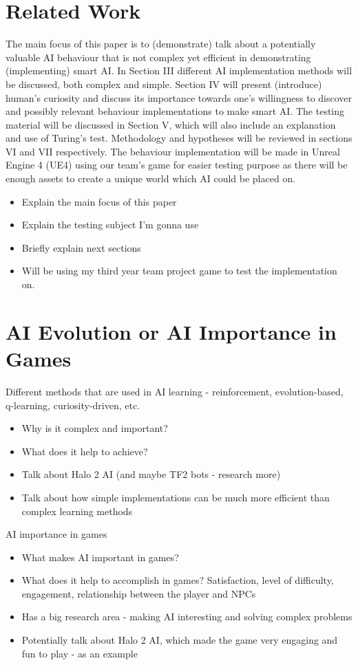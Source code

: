 \documentclass[journal]{IEEEtran}
\begin{document}
\section{Related Work} %
The main focus of this paper is to (demonstrate) talk about a potentially valuable AI behaviour that is not complex yet efficient in demonstrating (implementing) smart AI. In Section III different AI implementation methods will be discussed, both complex and simple. Section IV will present (introduce) human's curiosity and discuss its importance towards one's willingness to discover and possibly relevant behaviour implementations to make smart AI. The testing material will be discussed in Section V, which will also include an explanation and use of Turing's test. Methodology and hypotheses will be reviewed in sections VI and VII respectively. The behaviour implementation will be made in Unreal Engine 4 (UE4) using our team's game for easier testing purpose as there will be enough assets to create a unique world which AI could be placed on.
\begin{itemize}
	\item Explain the main focus of this paper
	\item Explain the testing subject I'm gonna use
	\item Briefly explain next sections
	\item Will be using my third year team project game to test the implementation on.
\end{itemize}

\section{AI Evolution or AI Importance in Games}
Different methods that are used in AI learning - reinforcement, evolution-based, q-learning, curiosity-driven, etc. 
\begin{itemize}
	\item Why is it complex and important?
	\item What does it help to achieve? 
	\item Talk about Halo 2 AI (and maybe TF2 bots - research more)
	\item Talk about how simple implementations can be much more efficient than complex learning methods
\end{itemize}

AI importance in games
\begin{itemize}
	\item What makes AI important in games?
	\item What does it help to accomplish in games? Satisfaction, level of difficulty, engagement, relationship between the player and NPCs
	\item Has a big research area - making AI interesting and solving complex problems
	\item Potentially talk about Halo 2 AI, which made the game very engaging and fun to play - as an example
\end{itemize}
\end{document}
